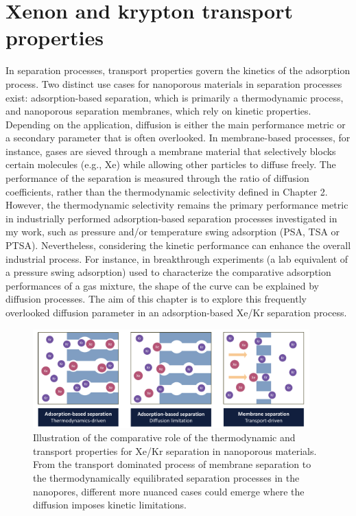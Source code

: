 \documentclass[main]{subfiles}
\begin{document}
\chapter{Xenon and krypton transport properties}
\vspace*{-1\baselineskip}


In separation processes, transport properties govern the kinetics of the adsorption process. Two distinct use cases for nanoporous materials in separation processes exist: adsorption-based separation, which is primarily a thermodynamic process, and nanoporous separation membranes, which rely on kinetic properties. Depending on the application, diffusion is either the main performance metric or a secondary parameter that is often overlooked. In membrane-based processes, for instance, gases are sieved through a membrane material that selectively blocks certain molecules (e.g., Xe) while allowing other particles to diffuse freely. The performance of the separation is measured through the ratio of diffusion coefficients, rather than the thermodynamic selectivity defined in Chapter 2. However, the thermodynamic selectivity remains the primary performance metric in industrially performed adsorption-based separation processes investigated in my work, such as pressure and/or temperature swing adsorption (PSA, TSA or PTSA). Nevertheless, considering the kinetic performance can enhance the overall industrial process.\autocite{Kumar_1994} For instance, in breakthrough experiments (a lab equivalent of a pressure swing adsorption) used to characterize the comparative adsorption performances of a gas mixture, the shape of the curve can be explained by diffusion processes. The aim of this chapter is to explore this frequently overlooked diffusion parameter in an adsorption-based Xe/Kr separation process.

\begin{figure}[ht]
  \centering
    \includegraphics[width=0.95\textwidth]{figures/5-diffusion/Diffusion.pdf}
    \caption{Illustration of the comparative role of the thermodynamic and transport properties for Xe/Kr separation in nanoporous materials. From the transport dominated process of membrane separation to the thermodynamically equilibrated separation processes in the nanopores, different more nuanced cases could emerge where the diffusion imposes kinetic limitations.}\label{fgr:intro_diffusion}
\end{figure}
\end{document}
